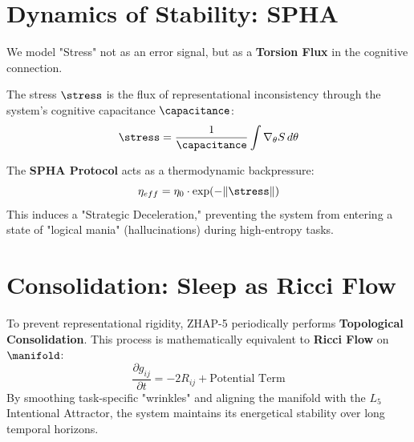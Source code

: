 \section{Dynamics of Stability: SPHA}
We model "Stress" not as an error signal, but as a \textbf{Torsion Flux} in the cognitive connection.

\begin{definition}
The stress $\stress$ is the flux of representational inconsistency through the system's cognitive capacitance $\capacitance$:
\begin{equation}
\stress = \frac{1}{\capacitance} \int \nabla_{\theta} S \, d\theta
\end{equation}
\end{definition}

The \textbf{SPHA Protocol} acts as a thermodynamic backpressure:
\begin{equation}
\eta_{eff} = \eta_0 \cdot \exp(-\|\stress\|)
\end{equation}
This induces a "Strategic Deceleration," preventing the system from entering a state of "logical mania" (hallucinations) during high-entropy tasks.

\section{Consolidation: Sleep as Ricci Flow}
To prevent representational rigidity, ZHAP-5 periodically performs \textbf{Topological Consolidation}. This process is mathematically equivalent to \textbf{Ricci Flow} on $\manifold$:
\begin{equation}
\frac{\partial g_{ij}}{\partial t} = -2R_{ij} + \text{Potential Term}
\end{equation}
By smoothing task-specific "wrinkles" and aligning the manifold with the $L_5$ Intentional Attractor, the system maintains its energetical stability over long temporal horizons.

